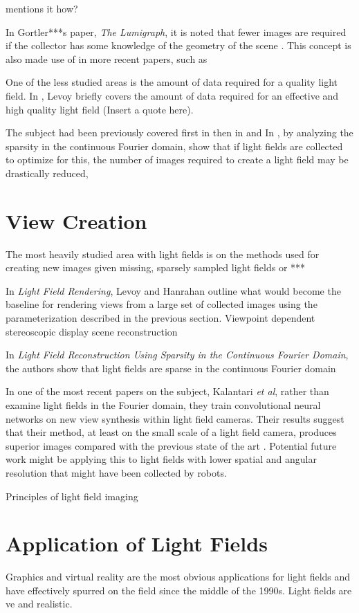\documentclass[12pt]{report}
\begin{document}
\cite{Isaksen01} mentions it how?

In Gortler***s paper, \emph{The Lumigraph}, it is noted that fewer images are required if the collector has some knowledge of the geometry of the scene \cite{Gortler96}. This concept is also made use of in more recent papers, such as \cite{Kim13}

One of the less studied areas is the amount of data required for a quality light field.
In \cite{Levoy06a}, Levoy briefly covers the amount of data required for an effective and high quality light field (Insert a quote here).

The subject had been previously covered first in \cite{Gortler96} then in \cite{Isaksen01} and \cite{Chai00}
In \cite{Shi14}, by analyzing the sparsity in the continuous Fourier domain, show that if light fields are collected to optimize for this, the number of images required to create a light field may be drastically reduced, 
\section*{View Creation}
The most heavily studied area with light fields is on the methods used for creating new images given missing, sparsely sampled light fields or ***

In \emph{Light Field Rendering}, Levoy and Hanrahan outline what would become the baseline for rendering views from a large set of collected images using the parameterization described in the previous section. 
\cite{Katayama95} Viewpoint dependent stereoscopic display
\cite{Kim13} scene reconstruction

In \emph{Light Field Reconstruction Using Sparsity in the Continuous Fourier Domain}, the authors show that light fields are sparse in the continuous Fourier domain \cite{Shi14} 

In one of the most recent papers on the subject, Kalantari \emph{et al}, rather than examine light fields in the Fourier domain, they train convolutional neural networks on new view synthesis within light field cameras. Their results suggest that their method, at least on the small scale of a light field camera, produces superior images compared with the previous state of the art \cite{Kalantari16}. Potential future work might be applying this to light fields with lower spatial and angular resolution that might have been collected by robots.

\cite{Ihrke16} Principles of light field imaging

\section*{Application of Light Fields}
Graphics and virtual reality are the most obvious applications for light fields and have effectively spurred on the field since the middle of the 1990s. Light fields are ve and realistic.
\end{document}
